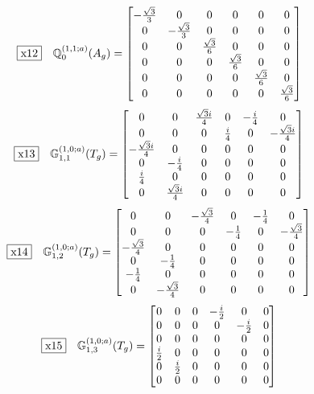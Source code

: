 \documentclass[fleqn,10pt,landscape]{jsarticle}
\begin{document}
\begin{dmath*}
\fbox{x12}\quad \mathbb{Q}_{0}^{(1,1;a)}(A_{g})=\begin{bmatrix} - \frac{\sqrt{3}}{3} & 0 & 0 & 0 & 0 & 0 \\ 0 & - \frac{\sqrt{3}}{3} & 0 & 0 & 0 & 0 \\ 0 & 0 & \frac{\sqrt{3}}{6} & 0 & 0 & 0 \\ 0 & 0 & 0 & \frac{\sqrt{3}}{6} & 0 & 0 \\ 0 & 0 & 0 & 0 & \frac{\sqrt{3}}{6} & 0 \\ 0 & 0 & 0 & 0 & 0 & \frac{\sqrt{3}}{6} \end{bmatrix}
\end{dmath*}
\begin{dmath*}
\fbox{x13}\quad \mathbb{G}_{1,1}^{(1,0;a)}(T_{g})=\begin{bmatrix} 0 & 0 & \frac{\sqrt{3} i}{4} & 0 & - \frac{i}{4} & 0 \\ 0 & 0 & 0 & \frac{i}{4} & 0 & - \frac{\sqrt{3} i}{4} \\ - \frac{\sqrt{3} i}{4} & 0 & 0 & 0 & 0 & 0 \\ 0 & - \frac{i}{4} & 0 & 0 & 0 & 0 \\ \frac{i}{4} & 0 & 0 & 0 & 0 & 0 \\ 0 & \frac{\sqrt{3} i}{4} & 0 & 0 & 0 & 0 \end{bmatrix}
\end{dmath*}
\begin{dmath*}
\fbox{x14}\quad \mathbb{G}_{1,2}^{(1,0;a)}(T_{g})=\begin{bmatrix} 0 & 0 & - \frac{\sqrt{3}}{4} & 0 & - \frac{1}{4} & 0 \\ 0 & 0 & 0 & - \frac{1}{4} & 0 & - \frac{\sqrt{3}}{4} \\ - \frac{\sqrt{3}}{4} & 0 & 0 & 0 & 0 & 0 \\ 0 & - \frac{1}{4} & 0 & 0 & 0 & 0 \\ - \frac{1}{4} & 0 & 0 & 0 & 0 & 0 \\ 0 & - \frac{\sqrt{3}}{4} & 0 & 0 & 0 & 0 \end{bmatrix}
\end{dmath*}
\begin{dmath*}
\fbox{x15}\quad \mathbb{G}_{1,3}^{(1,0;a)}(T_{g})=\begin{bmatrix} 0 & 0 & 0 & - \frac{i}{2} & 0 & 0 \\ 0 & 0 & 0 & 0 & - \frac{i}{2} & 0 \\ 0 & 0 & 0 & 0 & 0 & 0 \\ \frac{i}{2} & 0 & 0 & 0 & 0 & 0 \\ 0 & \frac{i}{2} & 0 & 0 & 0 & 0 \\ 0 & 0 & 0 & 0 & 0 & 0 \end{bmatrix}
\end{dmath*}
\end{document}
